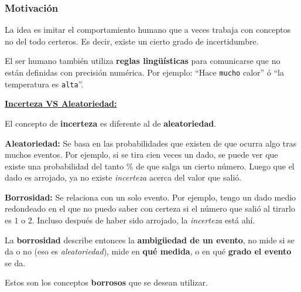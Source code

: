 \documentclass[10pt,a4paper]{article}
\begin{document}
\subsubsection{Motivación}

La idea es imitar el comportamiento humano que a veces trabaja con conceptos no del todo certeros. Es decir, existe un cierto grado de incertidumbre. 

El ser humano también utiliza \textbf{reglas lingüísticas} para comunicarse que no están definidas con precisión numérica. Por ejemplo: ``Hace \texttt{mucho} calor''  ó ``la temperatura es \texttt{alta}''.

\underline{\textbf{Incerteza VS Aleatoriedad:}}

El concepto de \textbf{incerteza} es diferente al de \textbf{aleatoriedad}. 
\begin{description}
\item \textbf{Aleatoriedad:} Se basa en las probabilidades que existen de que ocurra algo tras muchos eventos. Por ejemplo, si se tira cien veces un dado, se puede ver que existe una probabilidad del tanto \% de que salga un cierto número. Luego que el dado es arrojado, ya no existe \textit{incerteza} acerca del valor que salió.
\item \textbf{Borrosidad:}  Se relaciona con un solo evento. Por ejemplo, tengo un dado medio redondeado en el que no puedo saber con certeza si el número que salió al tirarlo es $1$ o $2$. Incluso después de haber sido arrojado, la \textit{incerteza} está ahí.
\end{description}

La \textbf{borrosidad} describe entonces la \textbf{ambigüedad de un evento}, no mide si se da o no (eso es \textit{aleatoriedad}), mide en \textbf{qué medida}, o en qué \textbf{grado el evento} se da.

Estos son los conceptos \textbf{borrosos} que se desean utilizar.\\
\linebreak
\end{document}
